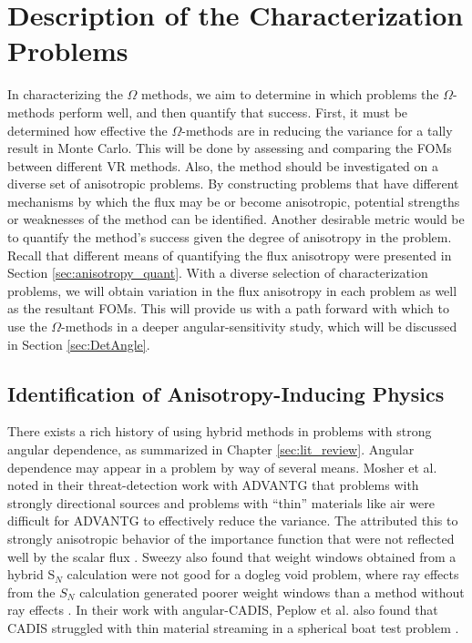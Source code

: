 \section{Description of the Characterization Problems}
\label{sec:AngleProbDesc}

In characterizing the $\Omega$ methods, we aim to determine in which problems
the $\Omega$-methods perform well, and then quantify that success.
First, it must be determined how effective the
$\Omega$-methods are in reducing the variance for a tally result in Monte Carlo.
This will be done by assessing and comparing the FOMs between different VR methods.
Also, the method should be investigated on a diverse set of anisotropic
problems. By constructing problems that have
different mechanisms by which the flux may be or become
anisotropic, potential strengths or weaknesses of the method can be identified.
Another desirable metric would be to quantify the method's success given the
degree of anisotropy in the problem. Recall that different
means of quantifying the flux
anisotropy were presented in Section \ref{sec:anisotropy_quant}. With a diverse
selection of characterization problems, we will obtain variation in the flux
anisotropy in each problem as well as the resultant FOMs. This will provide us
with a path forward with which to use the $\Omega$-methods in a deeper
angular-sensitivity study, which will be discussed in Section
\ref{sec:DetAngle}.

\subsection{Identification of Anisotropy-Inducing Physics}
\label{subsec:AngleProbID}

There exists a rich history of using hybrid methods in problems with strong
angular dependence, as summarized in Chapter \ref{sec:lit_review}. Angular
dependence may appear in a problem by way of several means.
Mosher et al. noted in their threat-detection work with ADVANTG
that problems with strongly directional sources and
problems with ``thin'' materials like air were difficult for ADVANTG to effectively
reduce the variance. The attributed this to strongly anisotropic behavior of the
importance function that were not reflected well by the scalar flux
\cite{mosher_automated_2009}. Sweezy also found that weight windows obtained
from a hybrid S$_N$ calculation were not good for a dogleg void problem,
where ray effects from the $S_N$ calculation generated poorer weight windows
than a method without ray effects \cite{sweezy_automated_2005}.
In their work with angular-CADIS, Peplow et
al. also found that CADIS struggled with thin material streaming in a spherical
boat test problem \cite{peplow_consistent_2012}.

